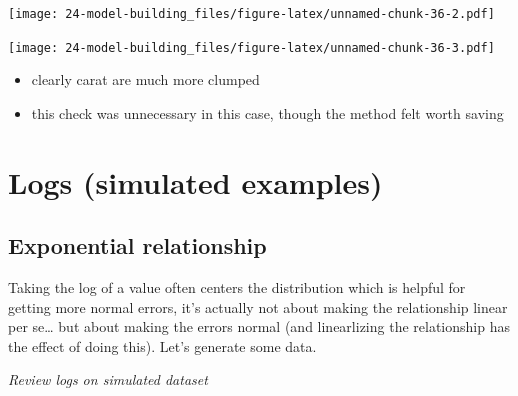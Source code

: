 \documentclass[]{book}
\newenvironment{Shaded}{\begin{snugshade}}{\end{snugshade}}
\newcommand{\DataTypeTok}[1]{\textcolor[rgb]{0.13,0.29,0.53}{#1}}
\newcommand{\KeywordTok}[1]{\textcolor[rgb]{0.13,0.29,0.53}{\textbf{#1}}}
\newcommand{\NormalTok}[1]{#1}
\newcommand{\OperatorTok}[1]{\textcolor[rgb]{0.81,0.36,0.00}{\textbf{#1}}}
\newcommand{\OtherTok}[1]{\textcolor[rgb]{0.56,0.35,0.01}{#1}}
\newcommand{\StringTok}[1]{\textcolor[rgb]{0.31,0.60,0.02}{#1}}
\providecommand{\tightlist}{%
  \setlength{\itemsep}{0pt}\setlength{\parskip}{0pt}}
\theoremstyle{definition}
\theoremstyle{definition}
\theoremstyle{definition}
\theoremstyle{remark}
\begin{document}
\texttt{[image: 24-model-building\_files/figure-latex/unnamed-chunk-36-2.pdf]}

\begin{Shaded}
\end{Shaded}

\texttt{[image: 24-model-building\_files/figure-latex/unnamed-chunk-36-3.pdf]}

\begin{itemize}
\tightlist
\item
  clearly carat are much more clumped
\item
  this check was unnecessary in this case, though the method felt worth
  saving
\end{itemize}

\hypertarget{logs-simulated-examples}{%
\section{Logs (simulated examples)}\label{logs-simulated-examples}}

\hypertarget{exponential-relationship}{%
\subsection{Exponential relationship}\label{exponential-relationship}}

Taking the log of a value often centers the distribution which is
helpful for getting more normal errors, it's actually not about making
the relationship linear per se\ldots{} but about making the errors
normal (and linearlizing the relationship has the effect of doing this).
Let's generate some data.

\emph{Review logs on simulated dataset}
\end{document}
